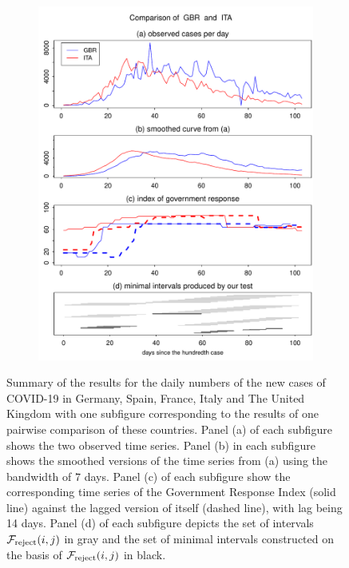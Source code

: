 \documentclass[a4paper,12pt]{article}
\numberwithin{equation}{section}
\begin{document}
\begin{figure}[t!]
\begin{subfigure}[b]{0.475\textwidth}
\includegraphics[width=\textwidth]{plots/GBR_vs_ITA}
\end{subfigure}
\vspace{0.25cm}

\caption{Summary of the results for the daily numbers of the new cases of COVID-19 in Germany, Spain, France, Italy and The United Kingdom with one subfigure corresponding to the results of one pairwise comparison of these countries. Panel (a) of each subfigure shows the two observed time series. Panel (b) in each subfigure shows the smoothed versions of the time series from (a) using the bandwidth of $7$ days. Panel (c) of each subfigure show the corresponding time series of the Government Response Index (solid line) against the lagged version of itself (dashed line), with lag being 14 days. Panel (d) of each subfigure depicts the set of intervals $\mathcal{F}_{\text{reject}}(i,j)$ in gray and the set of minimal intervals constructed on the basis of $\mathcal{F}_{\text{reject}}(i,j)$ in black.}\label{fig:MSE_slope10}
\end{figure}
\end{document}
